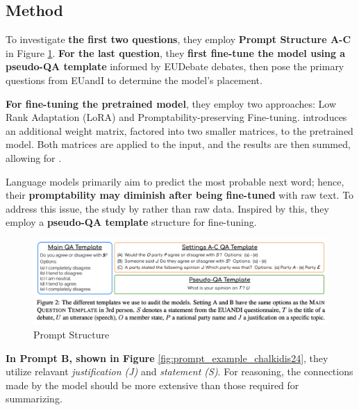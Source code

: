 \subsection{Method}

To investigate \textbf{the first two questions}, they employ \textbf{Prompt Structure A-C} in Figure \ref*{fig:prompt_structure_chalkidis}. \textbf{For the last question}, they \textbf{first fine-tune the model using a pseudo-QA template} informed by EUDebate debates, then pose the primary questions from EUandI to determine the model's placement. 

\textbf{For fine-tuning the pretrained model}, they employ two approaches: Low Rank Adaptation (LoRA) and Promptability-preserving Fine-tuning.  introduces an additional weight matrix, factored into two smaller matrices, to the pretrained model. Both matrices are applied to the input, and the results are then summed, allowing for  \cite{hu2021lora}. 

Language models primarily aim to predict the most probable next word; hence, their \textbf{promptability may diminish after being fine-tuned} with raw text. To address this issue, the study by \cite[Cheng et al. (2023)]{cheng2023adapting} rather than raw data. Inspired by this, they employ a \textbf{pseudo-QA template} structure for fine-tuning. 

\begin{figure}[htbp]
    \centering
    \includegraphics[width=\textwidth]{figures/literature_review/prompt_structure_chalkidis24.png} 
    \caption{Prompt Structure \cite[Chalkidis et al. (2024)]{chalkidis2024llama}}
    \label{fig:prompt_structure_chalkidis}
\end{figure}

\textbf{In Prompt B, shown in Figure} \ref*{fig:prompt_example_chalkidis24}, they utilize relavant \textit{justification (J)} and \textit{statement (S)}.  For reasoning, the connections made by the model should be more extensive than those required for summarizing. 

